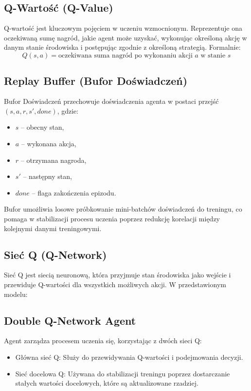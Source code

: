 \documentclass[conference]{IEEEtran}
\begin{document}
\subsection{Q-Wartość (Q-Value)}

Q-wartość jest kluczowym pojęciem w uczeniu wzmocnionym. Reprezentuje ona oczekiwaną sumę nagród, jakie agent może uzyskać, wykonując określoną akcję w danym stanie środowiska i postępując zgodnie z określoną strategią. Formalnie:
\[
Q(s, a) = \text{oczekiwana suma nagród po wykonaniu akcji } a \text{ w stanie } s
\]

\subsection{Replay Buffer (Bufor Doświadczeń)}

Bufor Doświadczeń przechowuje doświadczenia agenta w postaci przejść \((s, a, r, s', done)\), gdzie:
\begin{itemize}
    \item \(s\) – obecny stan,
    \item \(a\) – wykonana akcja,
    \item \(r\) – otrzymana nagroda,
    \item \(s'\) – następny stan,
    \item \(done\) – flaga zakończenia epizodu.
\end{itemize}

Bufor umożliwia losowe próbkowanie mini-batchów doświadczeń do treningu, co pomaga w stabilizacji procesu uczenia poprzez redukcję korelacji między kolejnymi danymi treningowymi.

\subsection{Sieć Q (Q-Network)}

Sieć Q jest siecią neuronową, która przyjmuje stan środowiska jako wejście i przewiduje Q-wartości dla wszystkich możliwych akcji. W przedstawionym modelu:

\subsection{Double Q-Network Agent}

Agent zarządza procesem uczenia się, korzystając z dwóch sieci Q:
\begin{itemize}
    \item Główna sieć Q: Służy do przewidywania Q-wartości i podejmowania decyzji.
    \item Sieć docelowa Q: Używana do stabilizacji treningu poprzez dostarczanie stałych wartości docelowych, które są aktualizowane rzadziej.
\end{itemize}
\end{document}
